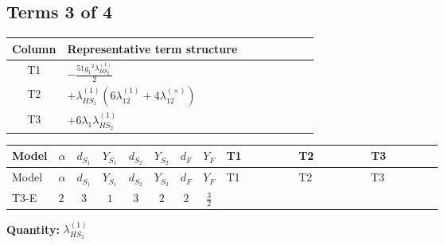 \documentclass[8pt]{article}
\begin{document}
\begin{landscape}
\subsection*{Terms 3 of 4}
\begin{center}
\begin{tabular}{@{}c >{\raggedright\arraybackslash}p{0.82\linewidth}@{}}
\toprule
Column & Representative term structure \\
\midrule
T1 & \(\displaystyle -\frac{51 {g_1}^2 {\lambda_{HS_2}^{(1)}}}{2}\) \\
\midrule
T2 & \(\displaystyle +{\lambda_{HS_1}^{(1)}} (6 {\lambda_{12}^{(1)}}+4 {\lambda_{12}^{(\times)}})\) \\
\midrule
T3 & \(\displaystyle +6 {\lambda_1} {\lambda_{HS_2}^{(1)}}\) \\
\midrule
\bottomrule
\end{tabular}
\end{center}
\smallskip
\tiny
\begin{longtable}{@{}llcccccc >{\raggedright\arraybackslash}p{0.21\linewidth} >{\raggedright\arraybackslash}p{0.21\linewidth} >{\raggedright\arraybackslash}p{0.21\linewidth}@{}}
\toprule
Model & $\alpha$ & $d_{S_1}$ & $Y_{S_1}$ & $d_{S_2}$ & $Y_{S_2}$ & $d_F$ & $Y_F$ & T1 & T2 & T3 \\
\midrule
\endfirsthead
\toprule
Model & $\alpha$ & $d_{S_1}$ & $Y_{S_1}$ & $d_{S_2}$ & $Y_{S_2}$ & $d_F$ & $Y_F$ & T1 & T2 & T3 \\
\midrule
\endhead
T3-E & $2$ & $3$ & $1$ & $3$ & $2$ & $2$ & $\frac{3}{2}$ & \scriptsize\adjustbox{max width=\linewidth}{$\begin{gathered} -\frac{51 {g_1}^2 {\lambda_{HS_2}^{(1)}}}{2}\end{gathered}$} & \scriptsize\adjustbox{max width=\linewidth}{$\begin{gathered} +{\lambda_{HS_1}^{(1)}} (6 {\lambda_{12}^{(1)}}+4 {\lambda_{12}^{(\times)}})\end{gathered}$} & \scriptsize\adjustbox{max width=\linewidth}{$\begin{gathered} +6 {\lambda_1} {\lambda_{HS_2}^{(1)}}\end{gathered}$} \\
\midrule
\bottomrule
\end{longtable}
\clearpage
\noindent\textbf{Quantity: }$\lambda_{HS_2}^{(1)}$\par\smallskip

\end{landscape}
\end{document}
